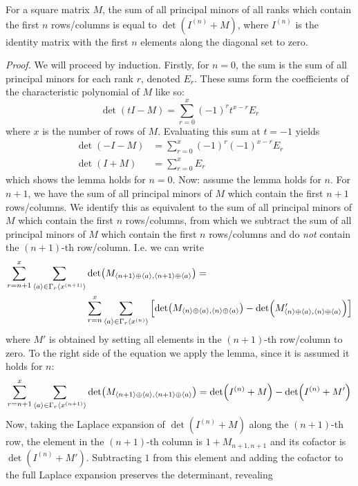 \begin{lemma} \label{lemma:sum of constrained principal minors}
For a square matrix $M$, the sum of all principal minors of all ranks which contain the first $n$ rows/columns is equal to $\det(I^{(n)}+M)$, where $I^{(n)}$ is the identity matrix with the first $n$ elements along the diagonal set to zero.
\end{lemma}
\textit{Proof.} We will proceed by induction. Firstly, for $n=0$, the sum is the sum of all principal minors for each rank $r$, denoted $E_r$. These sums form the coefficients of the characteristic polynomial of $M$ like so: \cite[Th. 1.2.16]{charpol}
	\begin{equation}
	\det(tI-M)=\sum_{r=0}^x(-1)^{r} t^{x-r} E_r
	\end{equation}
	where $x$ is the number of rows of $M$. Evaluating this sum at $t=-1$ yields
	\begin{align}
	\det(-I-M)&=\sum_{r=0}^x(-1)^{r} (-1)^{x-r} E_r\nonumber\\
	\det(I+M)&=\sum_{r=0}^x E_r
	\end{align}
	which shows the lemma holds for $n=0$. Now: assume the lemma holds for $n$. For $n+1$, we have the sum of all principal minors of $M$ which contain the first $n+1$ rows/columns. We identify this as equivalent to the sum of all principal minors of $M$ which contain the first $n$ rows/columns, from which we subtract the sum of all principal minors of $M$ which contain the first $n$ rows/columns and do \textit{not} contain the $(n+1)$-th row/column. I.e. we can write
	\begin{align}
	\sum_{r=n+1}^{x}\sum_{\langle a\rangle\in\Gamma_r\langle x^{(n+1)}\rangle}&\det(M_{\langle n+1\rangle\oplus\langle a\rangle,\langle n+1\rangle\oplus\langle a\rangle})=\\
	&\sum_{r=n}^{x}\sum_{\langle a\rangle\in\Gamma_r\langle x^{(n)}\rangle}\left[\det(M_{\langle n\rangle\oplus\langle a\rangle,\langle n\rangle\oplus\langle a\rangle})-\det(M'_{\langle n\rangle\oplus\langle a\rangle,\langle n\rangle\oplus\langle a\rangle})\right] \nonumber
	\end{align}
	where $M'$ is obtained by setting all elements in the $(n+1)$-th row/column to zero. To the right side of the equation we apply the lemma, since it is assumed it holds for $n$:
	\begin{equation} \label{eq: big minor sum from small minor sums}
	\sum_{r=n+1}^{x}\sum_{\langle a\rangle\in\Gamma_r\langle x^{(n+1)}\rangle}\det(M_{\langle n+1\rangle\oplus\langle a\rangle,\langle n+1\rangle\oplus\langle a\rangle})=\det(I^{(n)}+M)-\det(I^{(n)}+M')
	\end{equation}
	Now, taking the Laplace expansion of $\det(I^{(n)}+M)$ along the $(n+1)$-th row, the element in the $(n+1)$-th column is $1+M_{n+1,n+1}$ and its cofactor is $\det(I^{(n)}+M')$. Subtracting $1$ from this element and adding the cofactor to the full Laplace expansion preserves the determinant, revealing

